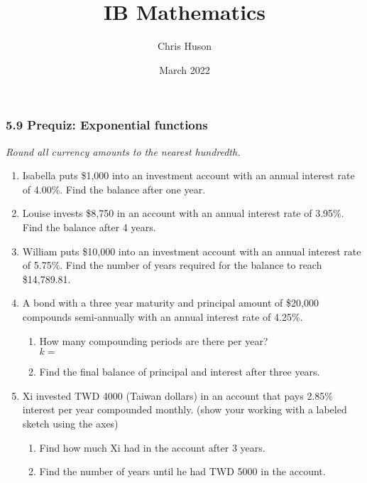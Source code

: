 \documentclass[12pt, twoside]{article}
\title{IB Mathematics}
\author{Chris Huson}
\date{March 2022}
\begin{document}
\subsubsection*{5.9 Prequiz: Exponential functions}
\emph{Round all currency amounts to the nearest hundredth.}
\begin{enumerate}
\item Isabella puts \$1,000 into an investment account with an annual interest rate of 4.00\%. Find the balance after one year. \vspace{1.5cm}

\item Louise invests \$8,750 in an account with an annual interest rate of 3.95\%. Find the balance after 4 years. \vspace{1.5cm}

\item William puts \$10,000 into an investment account with an annual interest rate of 5.75\%. Find the number of years required for the balance to reach \$14,789.81. \vspace{2cm}

\item A bond with a three year maturity and principal amount of \$20,000 compounds semi-annually with an annual interest rate of 4.25\%.
\begin{enumerate}[itemsep=0.5cm]
    \item How many compounding periods are there per year? \\[0.25cm]
    $k=$
    \item Find the final balance of principal and interest after three years.
\end{enumerate} \vspace{1.5cm}

\item Xi invested TWD 4000 (Taiwan dollars) in an account that pays 2.85\% interest per year compounded monthly. (show your working with a labeled sketch using the axes)
\begin{multicols}{2}
    \begin{enumerate}[itemsep=1cm]
        \item Find how much Xi had in the account after 3 years.
        \item Find the number of years until he had TWD 5000 in the account.
    \end{enumerate} \vspace{0.5cm}
    \begin{center}
    \end{center}
\end{multicols}



\end{enumerate}
\end{document}
